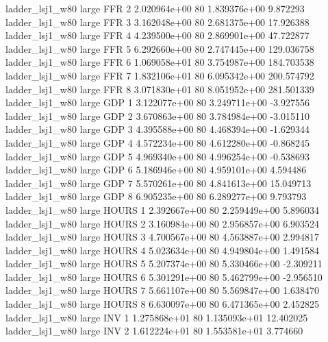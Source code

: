     ladder_lsj1_w80      large      FFR                 2 2.020964e+00 80   1.839376e+00           9.872293
    ladder_lsj1_w80      large      FFR                 3 3.162048e+00 80   2.681375e+00          17.926388
    ladder_lsj1_w80      large      FFR                 4 4.239500e+00 80   2.869901e+00          47.722877
    ladder_lsj1_w80      large      FFR                 5 6.292660e+00 80   2.747445e+00         129.036758
    ladder_lsj1_w80      large      FFR                 6 1.069058e+01 80   3.754987e+00         184.703538
    ladder_lsj1_w80      large      FFR                 7 1.832106e+01 80   6.095342e+00         200.574792
    ladder_lsj1_w80      large      FFR                 8 3.071830e+01 80   8.051952e+00         281.501339
    ladder_lsj1_w80      large      GDP                 1 3.122077e+00 80   3.249711e+00          -3.927556
    ladder_lsj1_w80      large      GDP                 2 3.670863e+00 80   3.784984e+00          -3.015110
    ladder_lsj1_w80      large      GDP                 3 4.395588e+00 80   4.468394e+00          -1.629344
    ladder_lsj1_w80      large      GDP                 4 4.572234e+00 80   4.612280e+00          -0.868245
    ladder_lsj1_w80      large      GDP                 5 4.969340e+00 80   4.996254e+00          -0.538693
    ladder_lsj1_w80      large      GDP                 6 5.186946e+00 80   4.959101e+00           4.594486
    ladder_lsj1_w80      large      GDP                 7 5.570261e+00 80   4.841613e+00          15.049713
    ladder_lsj1_w80      large      GDP                 8 6.905235e+00 80   6.289277e+00           9.793793
    ladder_lsj1_w80      large    HOURS                 1 2.392667e+00 80   2.259449e+00           5.896034
    ladder_lsj1_w80      large    HOURS                 2 3.160984e+00 80   2.956857e+00           6.903524
    ladder_lsj1_w80      large    HOURS                 3 4.700567e+00 80   4.563887e+00           2.994817
    ladder_lsj1_w80      large    HOURS                 4 5.023634e+00 80   4.949804e+00           1.491584
    ladder_lsj1_w80      large    HOURS                 5 5.207374e+00 80   5.330466e+00          -2.309211
    ladder_lsj1_w80      large    HOURS                 6 5.301291e+00 80   5.462799e+00          -2.956510
    ladder_lsj1_w80      large    HOURS                 7 5.661107e+00 80   5.569847e+00           1.638470
    ladder_lsj1_w80      large    HOURS                 8 6.630097e+00 80   6.471365e+00           2.452825
    ladder_lsj1_w80      large      INV                 1 1.275868e+01 80   1.135093e+01          12.402025
    ladder_lsj1_w80      large      INV                 2 1.612224e+01 80   1.553581e+01           3.774660
